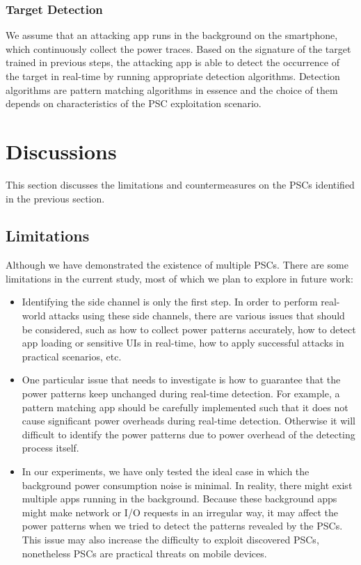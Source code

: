 \documentclass{sig-alternate}
\begin{document}
\subsubsection{Target Detection} We assume that an attacking app runs in the background on the smartphone, which continuously collect the power traces. Based on the signature of the target trained in previous steps, the attacking app is able to detect the occurrence of the target in real-time by running appropriate detection algorithms. Detection algorithms are pattern matching algorithms in essence and the choice of them depends on characteristics of the PSC exploitation scenario. 




\section{Discussions}
\label{sec:dis}

This section discusses the limitations and countermeasures on the PSCs identified in the previous section.
\subsection{Limitations}
Although we have demonstrated the existence of multiple PSCs. There are some limitations in the current study, most of which we plan to explore in future work:


\begin{itemize}

\item Identifying the side channel is only the first step. In order to perform real-world attacks using these side channels, there are various issues that should be considered, such as how to collect power patterns accurately, how to detect app loading or sensitive UIs in real-time, how to apply successful attacks in practical scenarios, etc.


\item One particular issue that needs to investigate is how to guarantee that the power patterns keep unchanged during real-time detection. For example, a pattern matching app should be carefully implemented such that it does not cause significant power overheads during real-time detection. Otherwise it will difficult to identify the power patterns due to power overhead of the detecting process itself.


\item In our experiments, we have only tested the ideal case in which the background power consumption noise is minimal. In reality, there might exist multiple apps running in the background. Because these background apps might make network or I/O requests in an irregular way, it may affect the power patterns when we tried to detect the patterns revealed by the PSCs. This issue may also increase the difficulty to exploit discovered PSCs, nonetheless PSCs are practical threats on mobile devices.

\end{itemize}
\end{document}
